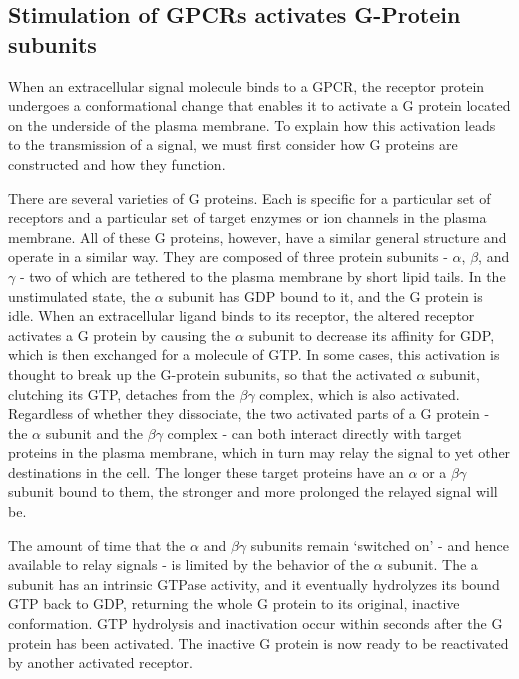\subsection{Stimulation of GPCRs activates G-Protein subunits}

When an extracellular signal molecule binds to a GPCR, the receptor
protein undergoes a conformational change that enables it to activate a
G protein located on the underside of the plasma membrane. To explain
how this activation leads to the transmission of a signal, we must first
consider how G proteins are constructed and how they function.

There are several varieties of G proteins. Each is specific for a particular
set of receptors and a particular set of target enzymes or ion channels
in the plasma membrane. All of these G proteins, however, have a similar
general structure and operate in a similar way. They are composed
of three protein subunits - $\alpha$, $\beta$, and $\gamma$ - two of which are tethered to the
plasma membrane by short lipid tails. In the unstimulated state, the $\alpha$
subunit has GDP bound to it, and the G protein is idle.
When an extracellular ligand binds to its receptor, the altered receptor
activates a G protein by causing the $\alpha$ subunit to decrease its affinity for
GDP, which is then exchanged for a molecule of GTP. In some cases, this
activation is thought to break up the G-protein subunits, so that the activated
$\alpha$ subunit, clutching its GTP, detaches from the $\beta\gamma$ complex, which is
also activated. Regardless of whether they dissociate, the
two activated parts of a G protein - the $\alpha$ subunit and the $\beta\gamma$ complex -
can both interact directly with target proteins in the plasma membrane,
which in turn may relay the signal to yet other destinations in the cell.
The longer these target proteins have an $\alpha$ or a $\beta\gamma$ subunit bound to them,
the stronger and more prolonged the relayed signal will be.

The amount of time that the $\alpha$ and $\beta\gamma$ subunits remain `switched on' -
and hence available to relay signals - is limited by the behavior of the $\alpha$
subunit. The a subunit has an intrinsic GTPase activity, and it eventually
hydrolyzes its bound GTP back to GDP, returning the whole G protein
to its original, inactive conformation. GTP hydrolysis and
inactivation occur within seconds after the G protein has been activated.
The inactive G protein is now ready to be reactivated by another activated receptor.


